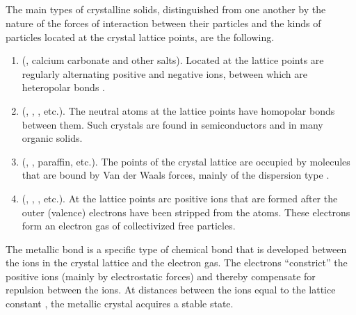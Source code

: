 \subsection{}\label{40.1.3} The main types of crystalline solids, distinguished from one another by the nature of the forces of interaction between their particles and the kinds of particles located at the crystal lattice points, are the following.
\begin{enumerate}[label=(\alph*)]
\item {} (, calcium carbonate and other salts). Located at the lattice points are regularly alternating positive and negative ions, between which are heteropolar bonds .
\item {} (, , , etc.). The neutral atoms at the lattice points have homopolar bonds  between them. Such crystals are found in  semiconductors  and in many organic solids.
\item {} (, , paraffin, etc.). The points of the crystal lattice are occupied by molecules that are bound by Van der Waals forces, mainly of the dispersion type .
\item {} (, , , etc.). At the lattice points arc positive ions that are formed after the outer (valence) electrons  have been stripped from the atoms. These electrons form an electron gas  of collectivized free particles.
\end{enumerate}

The metallic bond is a specific type of chemical bond  that is developed between the ions in the crystal lattice and the electron gas. The electrons ``constrict'' the positive ions (mainly by electrostatic forces) and thereby compensate for repulsion between the ions. At distances between the ions equal to the lattice constant , the metallic crystal acquires a stable state.

